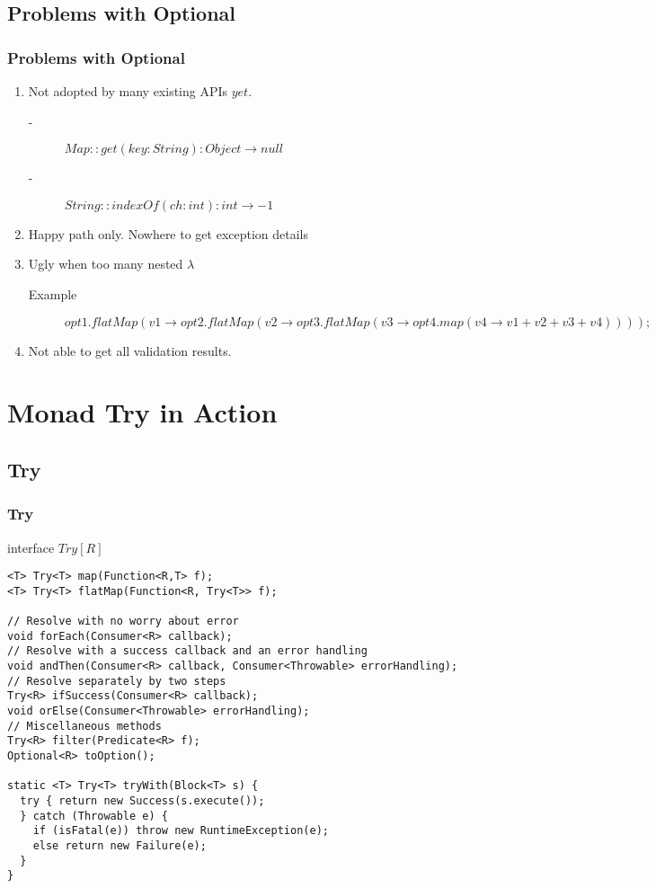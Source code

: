 \documentclass{beamer}
\begin{document}
\subsection{Problems with Optional}
\begin{frame}
  \frametitle{Problems with Optional}
    \begin{enumerate}
    \item Not adopted by many existing APIs $yet$.
      \begin{description}
      \item[-] $Map::get(key: String): Object \rightarrow null $
      \item[-] $String::indexOf(ch: int): int \rightarrow -1$
      \end{description}
    \item Happy path only. Nowhere to get exception details
    \item Ugly when too many nested \alert{$\lambda$}
        \begin{description}
        \item[Example] $opt1.flatMap(v1 \rightarrow opt2.flatMap(v2 \rightarrow opt3.flatMap(v3 \rightarrow opt4.map(v4 \rightarrow v1 + v2 + v3 + v4))));$
        \end{description}
    \item Not able to get all validation results.
    \end{enumerate}
\end{frame}
  
\section{Monad Try in Action}
\subsection{Try}
\begin{frame}[fragile]
  \frametitle{Try}
  interface $Try \left[R \right]$
  \scriptsize{
  \begin{verbatim}
<T> Try<T> map(Function<R,T> f);
<T> Try<T> flatMap(Function<R, Try<T>> f);

// Resolve with no worry about error
void forEach(Consumer<R> callback);
// Resolve with a success callback and an error handling
void andThen(Consumer<R> callback, Consumer<Throwable> errorHandling);
// Resolve separately by two steps
Try<R> ifSuccess(Consumer<R> callback);
void orElse(Consumer<Throwable> errorHandling);
// Miscellaneous methods
Try<R> filter(Predicate<R> f);
Optional<R> toOption();

static <T> Try<T> tryWith(Block<T> s) {
  try { return new Success(s.execute());
  } catch (Throwable e) {
    if (isFatal(e)) throw new RuntimeException(e);
    else return new Failure(e);
  }
}
  \end{verbatim}
  }
\end{frame}
\end{document}
